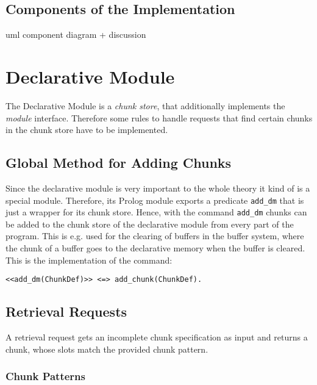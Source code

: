 \subsection{Components of the Implementation}

uml component diagram + discussion



\section{Declarative Module}

The Declarative Module is a \emph{chunk store}, that additionally implements the \emph{module} interface. Therefore some rules to handle requests that find certain chunks in the chunk store have to be implemented. 

\subsection{Global Method for Adding Chunks}
\label{global_method_for_adding_chunks}

Since the declarative module is very important to the whole theory it kind of is a special module. Therefore, its Prolog module exports a predicate \lstinline|add_dm| that is just a wrapper for its chunk store. Hence, with the command \lstinline|add_dm| chunks can be added to the chunk store of the declarative module from every part of the program. This is e.g. used for the clearing of buffers in the buffer system, where the chunk of a buffer goes to the declarative memory when the buffer is cleared. This is the implementation of the command:

\begin{lstlisting}
<<add_dm(ChunkDef)>> <=> add_chunk(ChunkDef).
\end{lstlisting}



\subsection{Retrieval Requests}
\label{retrieval_requests}

A retrieval request gets an incomplete chunk specification as input and returns a chunk, whose slots match the provided chunk pattern.

\subsubsection{Chunk Patterns}

